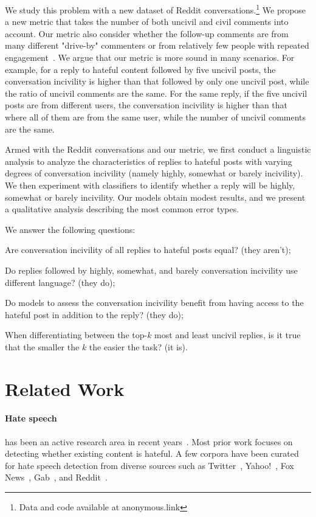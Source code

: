 \documentclass[11pt]{article}
\begin{document}
	We study this problem with a new dataset of Reddit conversations.\footnote{Data and code available at anonymous.link}
	We propose a new metric that takes the number of both uncivil and civil comments into account.
	Our metric also consider whether the follow-up comments are from many different "drive-by" commenters or from relatively few people with repeated engagement~\cite{10.1145/2433396.2433401}. 
	We argue that our metric is more sound in many scenarios.
	For example, for a reply to hateful content followed by five uncivil posts, the conversation incivility is higher than that followed by only one uncivil post,
	while the ratio of uncivil comments are the same.
	For the same reply, if the five uncivil posts are from different users, the conversation incivility is higher than that where all of them are from the same user,
	while the number of uncivil comments are the same.
	
	Armed with the Reddit conversations and our metric,
	we first conduct a linguistic analysis to analyze the characteristics of replies to hateful posts with varying degrees of conversation incivility (namely highly, somewhat or barely incivility).
	We then experiment with classifiers to identify whether a reply will be highly, somewhat or barely incivility.
	Our models obtain modest results,
	and we present a qualitative analysis describing the most common error types.
	
	We answer the following questions:
	\begin{compactenum}
		\item Are conversation incivility of all replies to hateful posts equal? (they aren't);
		\item Do replies followed by highly, somewhat, and barely conversation incivility use different language? (they do);
		\item Do models to assess the conversation incivility benefit from having access to the hateful post in addition to the reply? (they do);
		\item When differentiating between the top-$k$ most and least uncivil replies,
		is it true that the smaller the $k$ the easier the task? (it is).
	\end{compactenum}
	
	
	\section{Related Work}
	\label{s:related_work}
	\paragraph{Hate speech}
	has been an active research area in recent years~\cite{fortuna2018survey}. 
	Most prior work focuses on detecting whether existing content is hateful.
	A few corpora have been curated for hate speech detection from diverse sources such as
	Twitter~\cite{waseem-hovy-2016-hateful, hateoffensive},
	Yahoo!~\cite{nobata2016abusive},
	Fox News~\cite{gao-huang-2017-detecting},
	Gab~\cite{DBLP:conf/aaai/MathewSYBG021},
	and Reddit~\cite{qian-etal-2019-benchmark}.
	
\end{document}
